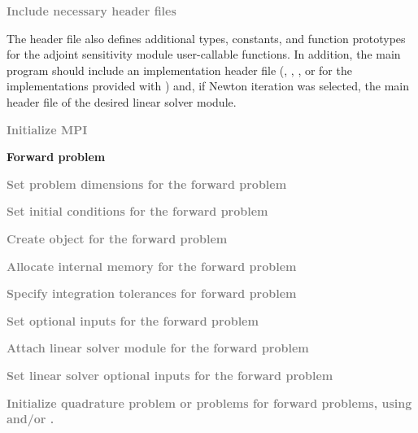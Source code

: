 \begin{Steps}

\item
  \textcolor{gray}{\bf Include necessary header files}
  
  The  header file also defines additional types, constants, and
  function prototypes for the adjoint sensitivity module user-callable functions.
  In addition, the main program should include an {\nvector} 
  implementation header file (,
  , , or 
  for the implementations provided with {\idas}) and, if Newton iteration 
  was selected, the main header file of the desired linear solver module.

\item
  \textcolor{gray}{\bf {\p} Initialize MPI}

  \vspace{0.2in}\centerline{\bf Forward problem}

\item
  \textcolor{gray}{\bf Set problem dimensions for the forward problem}

\item
  \textcolor{gray}{\bf Set initial conditions for the forward problem}

\item
  \textcolor{gray}{\bf Create {\idas} object for the forward problem}

\item
  \textcolor{gray}{\bf Allocate internal memory for the forward problem}

\item
  \textcolor{gray}{\bf Specify integration tolerances for forward problem}

\item
  \textcolor{gray}{\bf Set optional inputs for the forward problem}

\item
  \textcolor{gray}{\bf Attach linear solver module for the forward problem}

\item
  \textcolor{gray}{\bf Set linear solver optional inputs for the forward problem}

\item
  \textcolor{gray}{\bf Initialize quadrature problem or problems for forward
   problems, using  and/or .}


\end{Steps}
